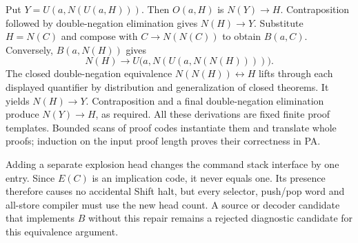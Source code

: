 Put $Y=U(a,N(U(a,H)))$. Then $O(a,H)$ is $N(Y)\to H$.
Contraposition followed by double-negation elimination gives
$N(H)\to Y$. Substitute $H=N(C)$ and compose with
$C\to N(N(C))$ to obtain $B(a,C)$.
Conversely, $B(a,N(H))$ gives
\[
 N(H)\to U\bigl(a,N(U(a,N(N(H))))\bigr).
\]
The closed double-negation equivalence $N(N(H))\leftrightarrow H$ lifts
through each displayed quantifier by distribution and generalization of
closed theorems. It yields $N(H)\to Y$. Contraposition and a final
double-negation elimination produce $N(Y)\to H$, as required.
All these derivations are fixed finite proof templates. Bounded scans of
proof codes instantiate them and translate whole proofs; induction on the
input proof length proves their correctness in PA.

Adding a separate explosion head changes the command stack interface by
one entry. Since $E(C)$ is an implication code, it never equals one. Its
presence therefore causes no accidental Shift halt, but every selector,
push/pop word and all-store compiler must use the new head count. A source
or decoder candidate that implements $B$ without this repair remains a
rejected diagnostic candidate for this equivalence argument.

